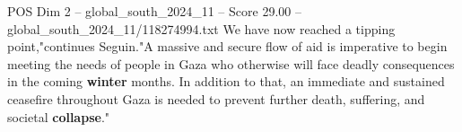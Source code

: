 \begin{textsample}{POS Dim 2 – global\_south\_2024\_11 – Score 29.00 – global\_south\_2024\_11/118274994.txt}
We have now reached a tipping point,"continues Seguin."A massive and secure flow of aid is imperative to begin meeting the needs of people in Gaza who otherwise will face deadly consequences in the coming \textbf{winter} months.
In addition to that, an immediate and sustained ceasefire throughout Gaza is needed to prevent further death, suffering, and societal \textbf{collapse}."

\end{textsample}
